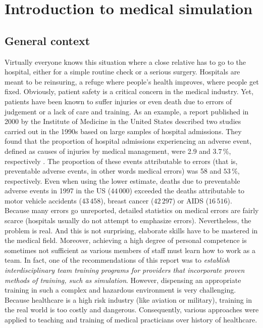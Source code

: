\chapter{Introduction to medical simulation}
\label{chap1}


\section{General context}

Virtually everyone knows this situation where a close relative has to go to the hospital, either for a simple routine check or a serious surgery. Hospitals are meant to be reinsuring, a refuge where people's health improves, where people get fixed. Obviously, patient safety is a critical concern in the medical industry. Yet, patients have been known to suffer injuries or even death due to errors of judgement or a lack of care and training. As an example, a report published in 2000 by the Institute of Medicine in the United States \citep{Kohn00} described two studies carried out in the 1990s based on large samples of hospital admissions. They found that the proportion of hospital admissions experiencing an adverse event, defined as causes of injuries by medical management, were 2.9 and $3.7\,$\%, respectively . The proportion of these events attributable to errors (that is, preventable adverse events, in other words medical errors) was 58 and $53\,$\%, respectively. Even when using the lower estimate, deaths due to preventable adverse events in 1997 in the US ($44\,000$) exceeded the deaths attributable to motor vehicle accidents ($43\,458$), breast cancer ($42\,297$) or AIDS ($16\,516$). Because many errors go unreported, detailed statistics on medical errors are fairly scarce (hospitals usually do not attempt to emphasize errors). Nevertheless, the problem is real. And this is not surprising, elaborate skills have to be mastered in the medical field. Moreover, achieving a high degree of personal competence is sometimes not sufficient as various members of staff must learn how to work as a team. In fact, one of the recommendations of this report \citep{Kohn00} was to \emph{establish interdisciplinary team training programs for providers that incorporate proven methods of training, such as simulation}. However, dispensing an appropriate training in such a complex and hazardous environment is very challenging. Because healthcare is a high risk industry (like aviation or military), training in the real world is too costly and dangerous. Consequently, various approaches were applied to teaching and training of medical practicians over history of healthcare. 

